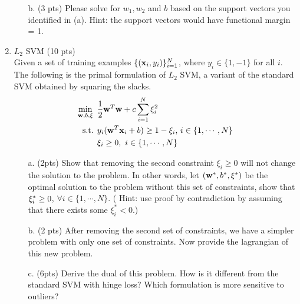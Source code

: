 \documentclass{article}
\def\x{{\bf x}}
\def\w{{\bf w}}
\begin{document}
\begin{enumerate}
\begin{itemize}
\item[b.] (3 pts) Please solve for $w_1, w_2$ and $b$ based on the support 
vectors you identified in (a). Hint: the support vectors would have functional 
margin = 1. \\
\end{itemize}
\item $L_2$ SVM (10 pts) \\
Given a set of training examples $\{(\x_i, y_i)\}_{i=1}^N$, where 
$y_i\in \{1, -1\}$ for all $i$. The following is the primal formulation of $L_2$ 
SVM, a variant of the standard SVM obtained by squaring the slacks.
\begin{align*}
\min_{\w, b, \xi} \mbox{ }& \frac{1}{2}\w^T\w+c\sum_{i=1}^N \xi_i^2 \\
\mbox{s.t. } & y_i(\w^T\x_i+b)\geq 1-\xi_i \mbox{,   } i \in \{1,\cdots,N\}\\
 & \xi_i\geq 0, \mbox{  }  i\in \{1,\cdots,N\}
\end{align*}

\begin{itemize}
\item [a.] (2pts) Show that removing the second constraint $\xi_i\geq 0$ will 
not change the solution to the problem. In other words, let 
$(\w^*, b^*, {\bf \xi}^*)$ be the optimal solution to the problem without this 
set of constraints, show that  
${\bf \xi}_i^* \geq 0$, $\forall i\in\{1,\cdots,N\} $. 
( Hint: use proof by contradiction by assuming that there exists 
some $\xi_i^*<0$.)\\

\item [b.] (2 pts) After removing the second set of constraints, we have a 
simpler problem with only one set of constraints. Now provide the lagrangian of 
this new problem.\\
\item [c.] (6pts) Derive the dual of this problem. How is it different from the 
standard SVM with hinge loss? Which formulation is more sensitive to outliers?\\


\end{itemize}
\end{enumerate}
\end{document}
